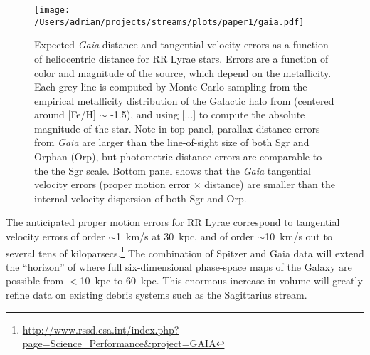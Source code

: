 \documentclass{emulateapj}
\begin{document}
\begin{figure}[h]
\begin{center}
\texttt{[image: /Users/adrian/projects/streams/plots/paper1/gaia.pdf]}
\caption{Expected \emph{Gaia} distance and tangential velocity errors as a function of heliocentric distance for RR Lyrae stars. Errors are a function of color and magnitude of the source, which depend on the metallicity. Each grey line  is computed by Monte Carlo sampling from the empirical metallicity distribution of
the Galactic halo from \cite{ivezic08} (centered around [Fe/H] $\sim$ -1.5), and using [...] to compute the absolute magnitude of the star. Note in top panel, parallax distance errors from \emph{Gaia} are larger than the line-of-sight size of both Sgr and Orphan (Orp), but photometric distance errors are comparable to the the Sgr scale. Bottom panel shows that the \emph{Gaia} tangential velocity errors (proper motion error $\times$ distance) are smaller than the internal velocity dispersion of both Sgr and Orp. }\label{fig:gaia_errors}
\end{center}
\end{figure}

The anticipated proper motion errors for RR Lyrae correspond to
tangential velocity errors of order $\sim$1~km/s at 30~kpc, and of
order $\sim$10~km/s out to several tens of
kiloparsecs.\footnote{\url{http://www.rssd.esa.int/index.php?page=Science_Performance&project=GAIA}}
The combination of Spitzer and Gaia data will extend the ``horizon''
of where full six-dimensional phase-space maps of the Galaxy are
possible from $<$10~kpc to 60~kpc. This enormous increase in volume
will greatly refine data on existing debris systems such as the
Sagittarius stream.
\end{document}
